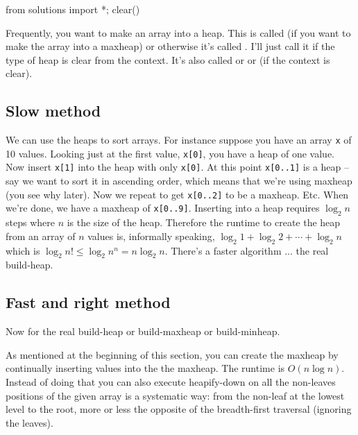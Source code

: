\begin{python0}
from solutions import *; clear()
\end{python0}

Frequently, you want to make an array into a heap.
This is called
(if you want to make
the array into a maxheap)
or otherwise it's called
.
I'll just call it 
if the type of heap is clear from the context.
It's also called
or
or
 (if the context is clear).


\subsection{Slow method}

We can use the heaps to sort arrays.
For instance suppose you have an array
\verb!x! of 10 values.
Looking just at the first value, \verb!x[0]!,
you have a heap of one
value.
Now insert \verb!x[1]! into the heap with only
\verb!x[0]!.
At this point \verb!x[0..1]! is a heap --
say we want to sort it in 
ascending order, which means that we're using maxheap
(you see why later).
Now we repeat to get \verb!x[0..2]! to be a maxheap.
Etc.
When we're done, we have a maxheap of \verb!x[0..9]!.
Inserting into a heap requires $\log_2 n$ steps
where $n$ is the
size of the heap.
Therefore the 
runtime to create the heap 
from an array of $n$ values is, informally speaking, 
$\log_2 1 + \log_2 2 + \cdots + \log_2 n$
which is $\log_2 n! \leq \log_2 n^n = n \log_2 n$.
There's a faster algorithm ... the real build-heap.




\subsection{Fast and right method}

Now for the real build-heap or build-maxheap or build-minheap.

As mentioned at the beginning of this section,
you can create the maxheap by continually inserting values into the
the maxheap.
The runtime is $O(n \log n)$.
Instead of doing that you can
also execute heapify-down on all the non-leaves positions
of the given array is a systematic way: from the non-leaf at the
lowest level to the root, more or less the opposite of the
breadth-first traversal (ignoring the leaves).

